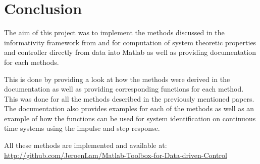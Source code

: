 \section{Conclusion}
The aim of this project was to implement the methods discussed in the informativity framework from \cite{waarde2019data} and \cite{waarde2020noisy} for computation of system theoretic properties and controller directly from data into Matlab as well as providing documentation for each methods.

This is done by providing a look at how the methods were derived in the documentation as well as providing corresponding functions for each method. This was done for all the methods described in the previously mentioned papers. The documentation also provides examples for each of the methods as well as an example of how the functions can be used for system identification on continuous time systems using the impulse and step response. 

All these methods are implemented and available at: \\
\url{http://github.com/JeroenLam/Matlab-Toolbox-for-Data-driven-Control}
